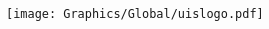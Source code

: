 
\begin{titlepage}
\begin{center}

\vspace*{2cm}

\begin{minipage}{0.70\textwidth}
\begin{center}
\begin{spacing}{1.6}
    {
        \Huge{\scshape\bfseries\DocumentTitle}}
\end{spacing}
\end{center}   
\end{minipage}

\vspace{-3mm}

\begin{minipage}{0.70\textwidth}
\begin{center}
\begin{spacing}{1.2}
    {
        \LARGE{\DocumentSubTitle}}
\end{spacing}
\end{center}   
\end{minipage}

\vspace{70mm}

\huge{\textit{\DocumentAuthor}}

\vspace{20mm}

\texttt{[image: Graphics/Global/uislogo.pdf]}

\vspace{10mm}

\begin{spacing}{1.1}
    \LARGE{\the\year} \\
    {\huge\DocumentUniversity}
\end{spacing}

\vfill


\end{center}
\end{titlepage}

